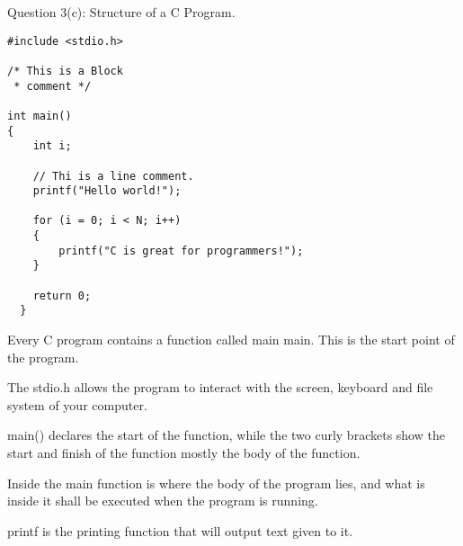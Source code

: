 \documentclass[12pt,legal]{article}
\begin{document}
Question 3(c): Structure of a C Program.




\lstset{escapechar=@,style=customc}


 \begin{lstlisting}
#include <stdio.h>

/* This is a Block
 * comment */

int main()
{
    int i;

    // Thi is a line comment.
    printf("Hello world!");
    
    for (i = 0; i < N; i++)
    {
        printf("C is great for programmers!");
    }

    return 0;
  }
\end{lstlisting}

  Every C program contains a function called main main. This is the start point
  of the program.

  The stdio.h allows the program to interact with the screen, keyboard and
  file  system of your computer.

  main() declares the start of the function, while the two curly brackets show
  the start and  finish of the function mostly the body of the function.

  Inside the main function is where the body of the program lies, and what is
  inside it shall be executed when the program is running.

  printf is the printing function that will output text given to it.

  
 
\end{document}
